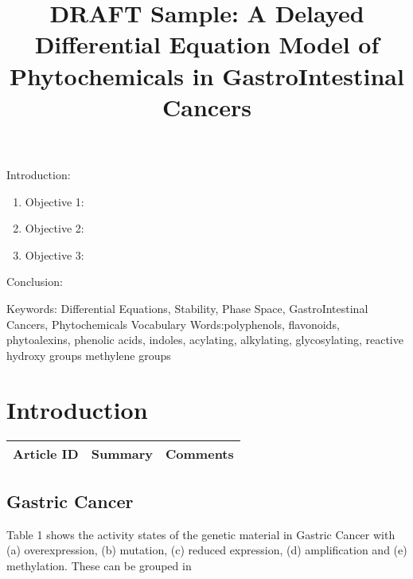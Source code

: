 

\twocolumn
\scriptsize
\begin{frontmatter}
		\title{DRAFT Sample: A Delayed Differential Equation Model of Phytochemicals in GastroIntestinal Cancers}
		\author{}
		\address{The Mathematical Learning Space}
\end{frontmatter}	

Introduction:
\begin{enumerate}
\item Objective 1:
\item Objective 2:
\item Objective 3:
\end{enumerate}
Conclusion:

Keywords: Differential Equations, Stability, Phase Space, GastroIntestinal Cancers, Phytochemicals
Vocabulary Words:polyphenols, flavonoids, phytoalexins, phenolic acids, indoles, acylating, alkylating, glycosylating, reactive hydroxy groups methylene groups 

\section{Introduction}

\begin{table}[H]\centering
	\begin{tabular}{p{1cm}p{4cm}p{3cm}}
		Article ID & Summary & Comments\\
		\hline
		\hline
	\end{tabular}
\end{table}


\subsection{Gastric Cancer}

Table 1 shows the activity states of the genetic material in Gastric Cancer with (a) overexpression, (b) mutation, (c) reduced expression, (d) amplification and (e) methylation.  These can be grouped in 

